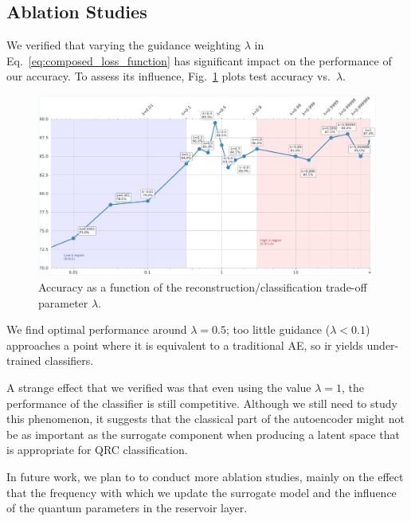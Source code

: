 \documentclass[conference]{IEEEtran}
\begin{document}
\subsection{Ablation Studies}

We verified that varying the guidance weighting $\lambda$ in Eq.~\ref{eq:composed_loss_function} has significant impact on the performance of our accuracy. To assess its influence, Fig.~\ref{fig:lambda_sweep} plots test accuracy vs.\ $\lambda$.

\begin{figure}[tb]
  \centering
  \includegraphics[width=1\linewidth]{images/results/generated_polyp_dataset/guided_lambda_log_mu_effect.pdf}
  \caption{Accuracy as a function of the reconstruction/classification trade-off parameter $\lambda$.}
  \label{fig:lambda_sweep}
\end{figure}

\noindent
We find optimal performance around $\lambda=0.5$; too little guidance ($\lambda<0.1$) approaches a point where it is equivalent to a traditional AE, so ir yields under-trained classifiers. 

A strange effect that we verified was that even using the value \(\lambda = 1\), the performance of the classifier is still competitive. Although we still need to study this phenomenon, it suggests that the classical part of the autoencoder might not be as important as the surrogate component when producing a latent space that is appropriate for QRC classification. 


In future work, we plan to to conduct more ablation studies, mainly on the effect that the frequency with which we update the surrogate model and the influence of the quantum parameters in the reservoir layer.
\end{document}
